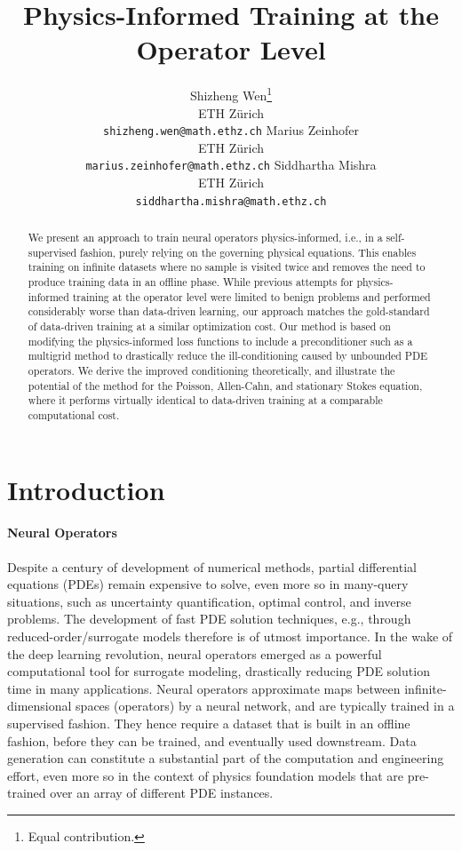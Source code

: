 \documentclass{article} %
\title{Physics-Informed Training at the Operator Level}
\author{
Shizheng Wen\thanks{Equal contribution.} \\
ETH Zürich \\
\texttt{shizheng.wen@math.ethz.ch}
\And
Marius Zeinhofer\footnotemark[1] \\
ETH Zürich \\
\texttt{marius.zeinhofer@math.ethz.ch}
\And
Siddhartha Mishra \\
ETH Zürich \\
\texttt{siddhartha.mishra@math.ethz.ch}
}
\begin{document}
\maketitle

\begin{abstract}
   We present an approach to train neural operators physics-informed, i.e., in a self-supervised fashion, purely relying on the governing physical equations. This enables training on infinite datasets where no sample is visited twice and removes the need to produce training data in an offline phase. While previous attempts for physics-informed training at the operator level were limited to benign problems and performed considerably worse than data-driven learning, our approach matches the gold-standard of data-driven training at a similar optimization cost. Our method is based on modifying the physics-informed loss functions to include a preconditioner such as a multigrid method to drastically reduce the ill-conditioning caused by unbounded PDE operators. We derive the improved conditioning theoretically, and illustrate the potential of the method for the Poisson, Allen-Cahn, and stationary Stokes equation, where it performs virtually identical to data-driven training at a comparable computational cost.
\end{abstract}

\section{Introduction}

\paragraph{Neural Operators}
Despite a century of development of numerical methods, partial differential equations (PDEs) remain expensive to solve, even more so in many-query situations, such as uncertainty quantification, optimal control, and inverse problems. The development of fast PDE solution techniques, e.g., through reduced-order/surrogate models therefore is of utmost importance. In the wake of the deep learning revolution, neural operators emerged as a powerful computational tool for surrogate modeling, drastically reducing PDE solution time in many applications. Neural operators approximate maps between infinite-dimensional spaces (operators) by a neural network, and are typically trained in a supervised fashion. They hence require a dataset that is built in an offline fashion, before they can be trained, and eventually used downstream. Data generation can constitute a substantial part of the computation and engineering effort, even more so in the context of physics foundation models that are pre-trained over an array of different PDE instances.
\end{document}

